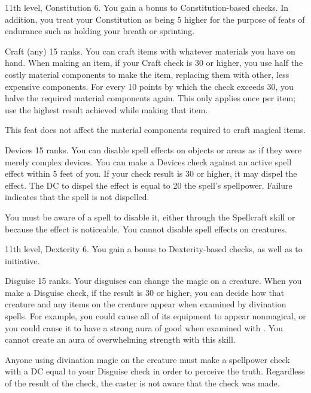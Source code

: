 \featpres 11th level, Constitution 6.
\featben You gain a  bonus to Constitution-based checks.
In addition, you treat your Constitution as being 5 higher for the purpose of feats of endurance such as holding your breath or sprinting.

\featpre Craft (any) 15 ranks.
\featben You can craft items with whatever materials you have on hand.
When making an item, if your Craft check is 30 or higher, you use half the costly material components to make the item, replacing them with other, less expensive components.
For every 10 points by which the check exceeds 30, you halve the required material components again.
This only applies once per item; use the highest result achieved while making that item.

This feat does not affect the material components required to craft magical items.

\featpre Devices 15 ranks.
\featben You can disable spell effects on objects or areas as if they were merely complex devices.
You can make a Devices check against an active spell effect within 5 feet of you.
If your check result is 30 or higher, it may dispel the effect.
The DC to dispel the effect is equal to 20 \add the spell's spellpower.
Failure indicates that the spell is not dispelled.

You must be aware of a spell to disable it, either through the Spellcraft skill or because the effect is noticeable.
You cannot disable spell effects on creatures.

\featpres 11th level, Dexterity 6.
\featben You gain a  bonus to Dexterity-based checks, as well as to initiative.

\featpre Disguise 15 ranks.
\featben Your disguises can change the magic on a creature.
When you make a Disguise check, if the result is 30 or higher, you can decide how that creature and any items on the creature appear when examined by divination spells.
For example, you could cause all of its equipment to appear nonmagical, or you could cause it to have a strong aura of good when examined with .
You cannot create an aura of overwhelming strength with this skill.

Anyone using divination magic on the creature must make a spellpower check with a DC equal to your Disguise check in order to perceive the truth.
Regardless of the result of the check, the caster is not aware that the check was made.

